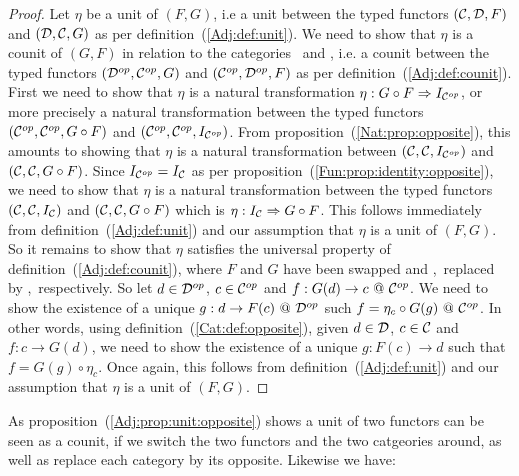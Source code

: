 \begin{proof}
    Let $\eta$ be a unit of $(F,G)$, i.e a unit between the typed functors 
    $(\mbox{$\cal C$},\mbox{$\cal D$},F)$ and $(\mbox{$\cal D$},\mbox{$\cal C$},G)$ as per definition~(\ref{Adj:def:unit}).
    We need to show that $\eta$ is a counit of $(G,F)$ in relation to the 
    categories \Dop\ and \Cop, i.e. a counit between the typed functors
    $(\mbox{${\cal D}^{op}$},\mbox{${\cal C}^{op}$},G)$ and $(\mbox{${\cal C}^{op}$},\mbox{${\cal D}^{op}$},F)$ as per definition~(\ref{Adj:def:counit}).
    First we need to show that $\eta$ is a natural transformation
    $\eta:G\circ F\Rightarrow I_{{\cal C}^{op}}$, or more precisely a natural
    transformation between the typed functors $(\mbox{${\cal C}^{op}$},\mbox{${\cal C}^{op}$},G\circ F)$ and
    $(\mbox{${\cal C}^{op}$},\mbox{${\cal C}^{op}$},I_{{\cal C}^{op}})$. From proposition~(\ref{Nat:prop:opposite}),
    this amounts to showing that $\eta$ is a natural transformation between
    $(\mbox{$\cal C$},\mbox{$\cal C$},I_{{\cal C}^{op}})$ and $(\mbox{$\cal C$},\mbox{$\cal C$},G\circ F)$. Since 
    $I_{{\cal C}^{op}}=I_{\cal C}$ as per 
    proposition~(\ref{Fun:prop:identity:opposite}), we need to show that
    $\eta$ is a natural transformation between the typed functors 
    $(\mbox{$\cal C$},\mbox{$\cal C$},I_{\cal C})$ and $(\mbox{$\cal C$},\mbox{$\cal C$},G\circ F)$ which is
    $\eta:I_{\cal C}\Rightarrow G\circ F$. This follows immediately from 
    definition~(\ref{Adj:def:unit}) and our assumption that $\eta$ is 
    a unit of $(F,G)$. So it remains to show that $\eta$ satisfies the 
    universal property of definition~(\ref{Adj:def:counit}), where
    $F$ and $G$ have been swapped and \Cat,\Dat\ replaced by \Dop,\Cop\
    respectively. So let $d\in\mbox{${\cal D}^{op}$}$, $c\in\mbox{${\cal C}^{op}$}$ and $f:G(d)\to c\ @\ \mbox{${\cal C}^{op}$}$.
    We need to show the existence of a unique $g:d\to F(c)\ @\ \Dop$ such
    $f=\eta_{c}\circ G(g)\ @\ \Cop$. In other words, using
    definition~(\ref{Cat:def:opposite}), given $d\in\mbox{$\cal D$}$, $c\in\mbox{$\cal C$}$ and 
    $f:c\to G(d)$, we need to show the existence of a unique $g:F(c)\to d$ 
    such that $f=G(g)\circ\eta_{c}$. Once again, this follows from 
    definition~(\ref{Adj:def:unit}) and our assumption that $\eta$ is a 
    unit of $(F,G)$. 
\end{proof}

As proposition~(\ref{Adj:prop:unit:opposite}) shows a unit of two functors can
be seen as a counit, if we switch the two functors and the two catgeories 
around, as well as replace each category by its opposite. Likewise we have:

